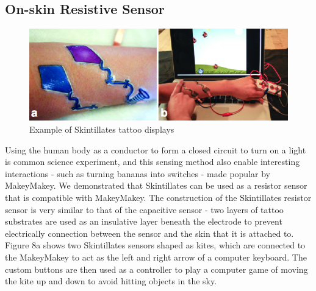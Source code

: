 \documentclass{sigchi}
\begin{document}
\subsection {On-skin Resistive Sensor}
\begin{figure}[!h]
\centering
\includegraphics[width=1\columnwidth]{figures/Figure8}
\caption{Example of Skintillates tattoo displays}
\label{fig:figure8}
\end{figure}
Using the human body as a conductor to form a closed circuit to turn on a light is common science experiment, and this sensing method %
also enable interesting interactions - such as turning bananas into switches - made popular by MakeyMakey.  %
 We demonstrated that Skintillates can be used as a resistor sensor that is compatible with MakeyMakey. The construction of the Skintillates resistor sensor is very similar to that of the capacitive sensor - two layers of tattoo substrates are used as an insulative layer beneath the electrode to prevent electrically connection between the sensor and the skin that it is attached to. Figure 8a shows two Skintillates sensors shaped as kites, which are connected to the MakeyMakey to act as the left and right arrow of a computer keyboard. The custom buttons are then used as a controller to play a computer game of moving the kite up and down to avoid hitting objects in the sky. 
\end{document}
